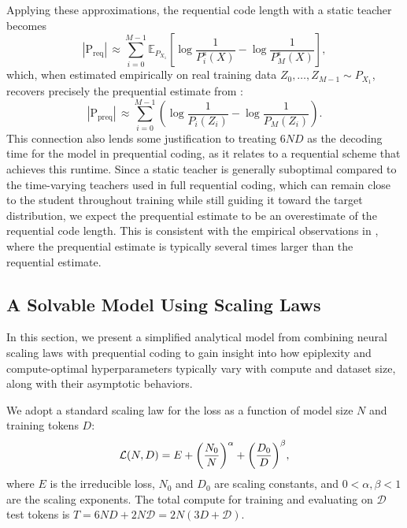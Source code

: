 \documentclass[twoside]{article}
\renewcommand{\L}{\mathcal{L}}
\newcommand{\E}{\mathbb{E}}
\renewcommand{\L}{\mathcal{L}}
\begin{document}
Applying these approximations, the requential code length with a static teacher becomes
\begin{equation}
    |\mathrm{P}_{\mathrm{req}}| \,\approx \sum_{i=0}^{M-1} \E_{P_{X_1}}\left[\log \frac{1}{P^{\mathrm{s}}_i(X)} - \log \frac{1}{P^{\mathrm{s}}_M(X)}\right],
\end{equation}
which, when estimated empirically on real training data $Z_0, \ldots, Z_{M-1} \sim P_{X_1}$, recovers precisely the prequential estimate from :
\begin{equation}
    |\mathrm{P}_{\mathrm{preq}}| \,\approx \sum_{i=0}^{M-1} \left(\log \frac{1}{P_i(Z_i)} - \log \frac{1}{P_M(Z_i)}\right).
\end{equation}
This connection also lends some justification to treating $6ND$ as the decoding time for the model in prequential coding, as it relates to a requential scheme that achieves this runtime.
Since a static teacher is generally suboptimal compared to the time-varying teachers used in full requential coding, which can remain close to the student throughout training while still guiding it toward the target distribution, we expect the prequential estimate to be an overestimate of the requential code length. This is consistent with the empirical observations in , where the prequential estimate is typically several times larger than the requential estimate.

\subsection{A Solvable Model Using Scaling Laws} \label{app:scaling-law-model}

In this section, we present a simplified analytical model from combining neural scaling laws with prequential coding to gain insight into how epiplexity and compute-optimal hyperparameters typically vary with compute and dataset size, along with their asymptotic behaviors.

We adopt a standard scaling law for the loss as a function of model size $N$ and training tokens $D$:
\begin{align}
    \L(N,D) = E + \qty(\frac{N_0}{N})^{\alpha} + \qty(\frac{D_0}{D})^{\beta},
\end{align}
where $E$ is the irreducible loss, $N_0$ and $D_0$ are scaling constants, and $0 < \alpha, \beta < 1$ are the scaling exponents. The total compute for training and evaluating on $\mathcal{D}$ test tokens is $T = 6ND + 2N\mathcal{D} = 2N(3D + \mathcal{D})$.
\end{document}
